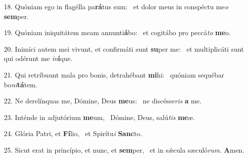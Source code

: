 18. Quóniam ego in flagélla pa\textbf{rá}tus sum: \ast\  et dolor meus in conspéctu me\textit{o} \textbf{sem}per.\

19. Quóniam iniquitátem meam annunti\textbf{á}bo: \ast\  et cogitábo pro peccá\textit{to} \textbf{me}o.\

20. Inimíci autem mei vivunt, et confirmáti sunt \textbf{su}per me: \ast\  et multiplicáti sunt qui odérunt me \textit{in}\textbf{í}que.\

21. Qui retríbuunt mala pro bonis, detrahébant \textbf{mi}hi: \ast\  quóniam sequébar bo\textit{ni}\textbf{tá}tem.\

22. Ne derelínquas me, Dómine, Deus \textbf{me}us: \ast\  ne discésse\textit{ris} \textbf{a} me.\

23. Inténde in adjutórium \textbf{me}um, \ast\  Dómine, Deus, salú\textit{tis} \textbf{me}æ.\

24. Glória Patri, et \textbf{Fí}lio, \ast\  et Spirítu\textit{i} \textbf{Sanc}to.\

25. Sicut erat in princípio, et nunc, et \textbf{sem}per, \ast\  et in sǽcula sæculó\textit{rum}. \textbf{A}men.\

